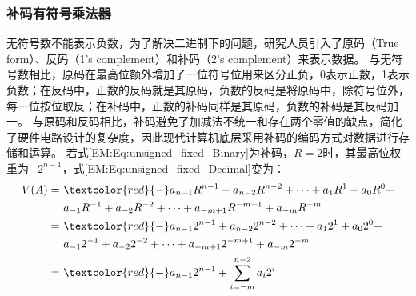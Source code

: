 \subsubsection{补码有符号乘法器}

无符号数不能表示负数，为了解决二进制下的问题，研究人员引入了原码（True form）、反码（1's complement）和补码（2's complement）来表示数据。
与无符号数相比，原码在最高位额外增加了一位符号位用来区分正负，0表示正数，1表示负数；在反码中，正数的反码就是其原码，负数的反码是将原码中，除符号位外，每一位按位取反；在补码中，正数的补码同样是其原码，负数的补码是其反码加一。
与原码和反码相比，补码避免了加减法不统一和存在两个零值的缺点，简化了硬件电路设计的复杂度，因此现代计算机底层采用补码的编码方式对数据进行存储和运算。
若式\eqref{EM:Eq:unsigned_fixed_Binary}为补码，$R=2$时，其最高位权重为$-2^{n-1}$，式\eqref{EM:Eq:unsigned_fixed_Decimal}变为：
\begin{align}
    V(A) = & \ \textcolor{red}{-}a_{n-1}  R^{n-1} + a_{n-2}  R^{n-2} + \cdots + a_1  R^1 + a_0  R^0 + \notag \\
    & \ a_{-1}  R^{-1} + a_{-2}  R^{-2} + \cdots + a_{-m+1}  R^{-m+1} + a_{-m}  R^{-m} \notag \\
    = & \ \textcolor{red}{-}a_{n-1}  2^{n-1} + a_{n-2}  2^{n-2} + \cdots + a_1  2^1 + a_0  2^0 + \notag \\
    & \ a_{-1}  2^{-1} + a_{-2}  2^{-2} + \cdots + a_{-m+1}  2^{-m+1} + a_{-m}  2^{-m} \notag \\
    = & \ \textcolor{red}{-}a_{n-1}  2^{n-1} + \sum_{i=-m}^{n-2} a_i  2^i
\label{EM:Eq:signed_fixed_Decimal}
\end{align}

